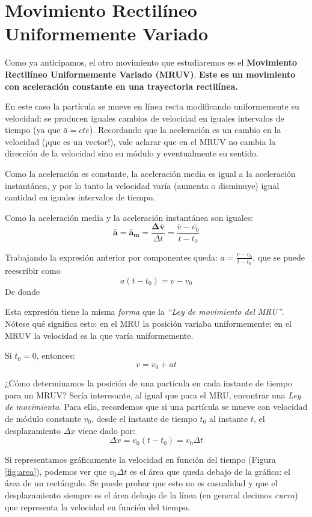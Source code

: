 \section{Movimiento Rectilíneo Uniformemente Variado}
Como ya anticipamos, el otro movimiento que estudiaremos es el \textbf{Movimiento Rectilíneo Uniformemente Variado (MRUV)}. \textbf{Este es un movimiento con aceleración constante en una trayectoria rectilínea.}

En este caso la partícula se mueve en línea recta modificando uniformemente su velocidad: se producen iguales cambios de velocidad en iguales intervalos de tiempo (ya que $\bar{a} = cte$). Recordando que la aceleración es un cambio en la velocidad (¡que es un vector!), vale aclarar que en el MRUV no cambia la dirección de la velocidad sino su módulo y eventualmente su sentido.

Como la aceleración es constante, la aceleración media es igual a la aceleración instantánea, y por lo tanto la velocidad varía (aumenta o disminuye) igual cantidad en
iguales intervalos de tiempo.

Como la aceleración media y la aceleración instantánea son iguales:
$$\mathbf{\bar{a}}=\mathbold{\bar{a}_m}=\frac{\mathbold{\Delta \bar{v}}}{\Delta t}=\frac{\bar{v}-\bar{v_0}}{t-t_0}$$

Trabajando la expresión anterior por componentes queda: $\displaystyle {a}=\frac{{v}-{v_0}}{t-t_0}$,
que se puede reescribir como
$${a}(t-t_0) = {v} - {v_0}$$
De donde
\begin{center}
{\color{NavyBlue}  }
\end{center}
Esta expresión tiene la misma {\it forma} que la {\em ``Ley de movimiento del MRU''}. Nótese qué significa esto: en el MRU la posición variaba uniformemente; en el MRUV la velocidad es la que varía uniformemente.

Si $t_0=0$, entonces:
$${v}={v}_0+{a}t$$

¿Cómo determinamos la posición de una partícula en cada instante de tiempo para un MRUV? Sería interesante, al igual que para el MRU, encontrar una \textit{Ley de movimiento}. Para ello, recordemos que si una partícula se mueve con velocidad de módulo constante $v_0$, desde el instante de tiempo $t_0$ al instante $t$, el desplazamiento $\Delta x$ viene dado por:
$$\Delta x = v_0 (t-t_0)=v_0 \Delta t$$

Si representamos gráficamente la velocidad en función del tiempo (Figura \ref{fig:area}), podemos ver que $v_0 \Delta t$ es el área que queda debajo de la gráfica: el área de un rectángulo. Se puede probar que esto no es casualidad y que el desplazamiento siempre es el área debajo de la línea (en general decimos \textit{curva}) que representa la velocidad en función del tiempo.

